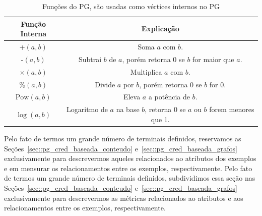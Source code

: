 
\begin{table}[ht*]
\centering
\caption{Funções do \textsc{PG}, são usadas como vértices internos no \textsc{PG}}
\begin{tabular}{|c|c|}
\toprule
    \textbf{Função Interna} & \textbf{Explicação} \\
\midrule
    +$(a,b)$           & Soma $a$ com $b$. \tabularnewline \hline
    -$(a,b)$           & Subtrai $b$ de $a$, porém retorna 0 se $b$ for maior que $a$.\tabularnewline \hline
    $\times(a,b)$       & Multiplica $a$ com $b$. \tabularnewline \hline
    \%$(a,b)$          & Divide $a$ por $b$, porém retorna 0 se $b$ for 0. \tabularnewline \hline
    $\text{Pow}(a,b)$  & Eleva $a$ a potência de $b$. \tabularnewline \hline 
    $\log(a,b) $       & Logaritmo de $a$ na base $b$, retorna 0 se $a$ ou $b$ forem menores que 1. \tabularnewline
\bottomrule
\end{tabular}
\label{table::funcoespg}
\end{table}

Pelo fato de termos um grande número de terminais definidos, reservamos as Seções~\ref{sec::pg_cred_baseada_conteudo} e~\ref{sec::pg_cred_baseada_grafos} exclusivamente para descrevermos aqueles relacionados ao atributos dos exemplos e em mensurar os relacionamentos entre os exemplos, respectivamente. 
Pelo fato de termos um grande número de terminais definidos, subdividimos essa seção nas Seções~\ref{sec::pg_cred_baseada_conteudo} e~\ref{sec::pg_cred_baseada_grafos} exclusivamente para descrevermos as métricas relacionados ao atributos e aos relacionamentos entre os exemplos, respectivamente. 




